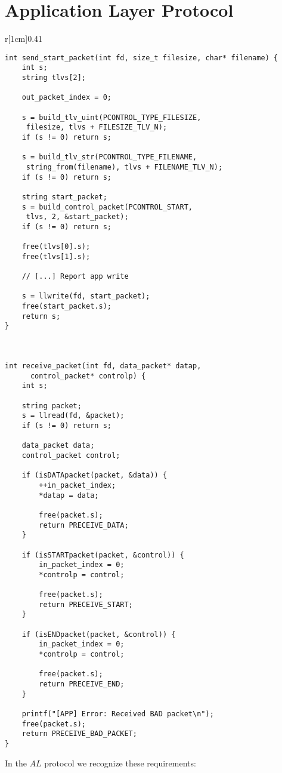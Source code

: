 \documentclass[main.tex]{subfiles}
\begin{document}
\section{Application Layer Protocol}
\label{sec:alprotocol}

\begin{wrapfigure}[31]{r}[1cm]{0.41\textwidth}
\begin{lstlisting}[style=rcom]
int send_start_packet(int fd, size_t filesize, char* filename) {
	int s;
	string tlvs[2];
	
	out_packet_index = 0;
	
	s = build_tlv_uint(PCONTROL_TYPE_FILESIZE,
	 filesize, tlvs + FILESIZE_TLV_N);
	if (s != 0) return s;
	
	s = build_tlv_str(PCONTROL_TYPE_FILENAME,
	 string_from(filename), tlvs + FILENAME_TLV_N);
	if (s != 0) return s;
	
	string start_packet;
	s = build_control_packet(PCONTROL_START,
	 tlvs, 2, &start_packet);
	if (s != 0) return s;
	
	free(tlvs[0].s);
	free(tlvs[1].s);
	
	// [...] Report app write
	
	s = llwrite(fd, start_packet);
	free(start_packet.s);
	return s;
}



int receive_packet(int fd, data_packet* datap,
	  control_packet* controlp) {
	int s;
	
	string packet;
	s = llread(fd, &packet);
	if (s != 0) return s;
	
	data_packet data;
	control_packet control;
	
	if (isDATApacket(packet, &data)) {
		++in_packet_index;
		*datap = data;
		
		free(packet.s);
		return PRECEIVE_DATA;
	}
	
	if (isSTARTpacket(packet, &control)) {
		in_packet_index = 0;
		*controlp = control;
		
		free(packet.s);
		return PRECEIVE_START;
	}
	
	if (isENDpacket(packet, &control)) {
		in_packet_index = 0;
		*controlp = control;
		
		free(packet.s);
		return PRECEIVE_END;
	}
	
	printf("[APP] Error: Received BAD packet\n");
	free(packet.s);
	return PRECEIVE_BAD_PACKET;
}
\end{lstlisting}
\end{wrapfigure}

In the $AL$ protocol we recognize these requirements:
\end{document}
